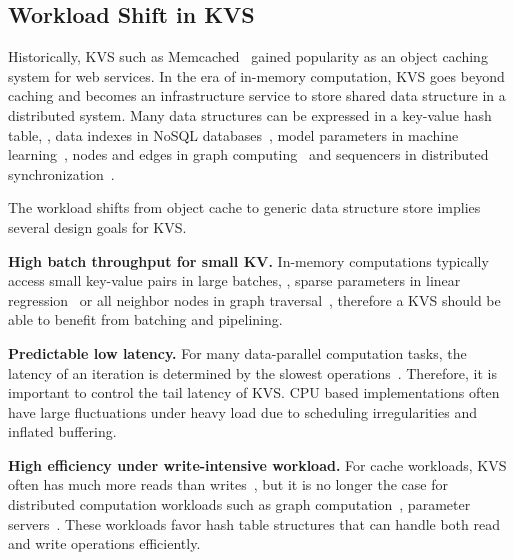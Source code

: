 \subsection{Workload Shift in KVS}
\label{kvdirect:sec:workload-shift}

Historically, KVS such as Memcached~\cite{fitzpatrick2004distributed} gained popularity as an object caching system for web services.
In the era of in-memory computation, KVS goes beyond caching and becomes an infrastructure service to store shared data structure in a distributed system.
Many data structures can be expressed in a key-value hash table, \eg, data indexes in NoSQL databases~\cite{chang2008bigtable}, model parameters in machine learning~\cite{li2014scaling}, nodes and edges in graph computing~\cite{shao2013trinity, xiao17tux2} and sequencers in distributed synchronization~\cite{kalia2016design,eris}.

The workload shifts from object cache to generic data structure store implies several design goals for KVS.

\textbf{High batch throughput for small KV.}
In-memory computations typically access small key-value pairs in large batches, \eg, sparse parameters in linear regression~\cite{li2014algorithmic, xiao17tux2} or all neighbor nodes in graph traversal~\cite{shao2013trinity}, therefore a KVS should be able to benefit from batching and pipelining.

\textbf{Predictable low latency.}
For many data-parallel computation tasks, the latency of an iteration is determined by the slowest operations~\cite{ousterhout2015ramcloud}. Therefore, it is important to control the tail latency of KVS. CPU based implementations often have large fluctuations under heavy load due to scheduling irregularities and inflated buffering.

\textbf{High efficiency under write-intensive workload.}
For cache workloads, KVS often has much more reads than writes~\cite{atikoglu2012workload}, but it is no longer the case for distributed computation workloads
such as graph computation~\cite{page1999pagerank}, parameter servers~\cite{li2014scaling}.
These workloads favor hash table structures that can handle both read and write operations efficiently.


